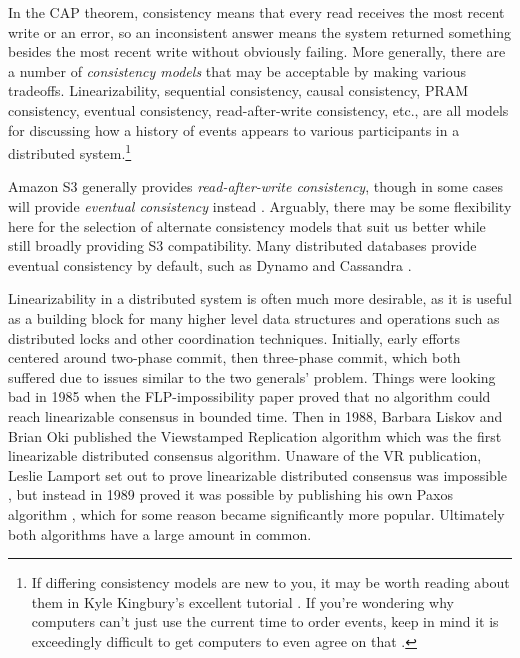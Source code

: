 \documentclass[a4paper,10pt]{article} \usepackage[utf8]{inputenc}
\begin{document}
In the CAP theorem, consistency means that every read receives the most recent
write or an error, so an inconsistent answer means the system returned something
besides the most recent write without obviously failing. More generally, there
are a number of {\em consistency models} that may be acceptable by making
various tradeoffs. Linearizability, sequential consistency, causal consistency,
PRAM consistency, eventual consistency, read-after-write consistency, etc., are
all models for discussing how a history of events appears to various
participants in a distributed system.\footnote{If differing consistency models
are new to you, it may be worth reading about them in Kyle Kingbury's excellent
tutorial \cite{aphyr-consistency}. If you're wondering why computers can't just
use the current time to order events, keep in mind it is exceedingly difficult
to get computers to even agree on that \cite{no-now}.}

Amazon S3 generally provides {\em read-after-write consistency}, though in some
cases will provide {\em eventual consistency} instead \cite{s3-consistency}.
Arguably, there may be some flexibility here for the selection of alternate
consistency models that suit us better while still broadly providing S3
compatibility. Many distributed databases provide eventual consistency by
default, such as Dynamo \cite{dynamo} and Cassandra \cite{cassandra}.

Linearizability in a distributed system is often much more desirable, as it is
useful as a building block for many higher level data structures and operations
such as distributed locks and other coordination techniques. Initially, early
efforts centered around two-phase commit, then three-phase commit, which both
suffered due to issues similar to the two generals' problem. Things were looking
bad in 1985 when the FLP-impossibility paper \cite{flp} proved that no algorithm
could reach linearizable consensus in bounded time. Then in 1988, Barbara Liskov
and Brian Oki published the Viewstamped Replication algorithm \cite{vr} which
was the first linearizable distributed consensus algorithm. Unaware of the VR
publication, Leslie Lamport set out to prove linearizable distributed consensus
was impossible \cite{paxos-note}, but instead in 1989 proved it was possible by
publishing his own Paxos algorithm \cite{paxos}, which for some reason became
significantly more popular. Ultimately both algorithms have a large amount in
common.
\end{document}
